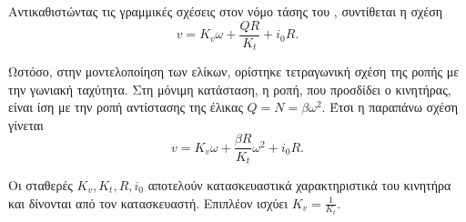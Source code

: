 Αντικαθιστώντας τις γραμμικές σχέσεις στον νόμο τάσης του , 
συντίθεται η σχέση
\begin{equation*}
    v = K_v \omega + \frac{Q R}{K_t} + i_0 R.
\end{equation*}

Ωστόσο, στην μοντελοποίηση των ελίκων, ορίστηκε τετραγωνική σχέση της ροπής
με την γωνιακή ταχύτητα. Στη μόνιμη κατάσταση, η ροπή, που προσδίδει ο 
κινητήρας, είναι ίση με την ροπή αντίστασης της έλικας \(Q = N = \beta 
\omega^2\). Έτσι η παραπάνω σχέση γίνεται
\begin{equation*}
    v = K_v \omega + \frac{\beta R}{K_t}\omega^2 + i_0 R.
\end{equation*}

Οι σταθερές \(K_v, K_t, R, i_0\) αποτελούν κατασκευαστικά χαρακτηριστικά του
κινητήρα και δίνονται από τον κατασκευαστή. Επιπλέον ισχύει 
$K_v = \frac{1}{K_t}$.